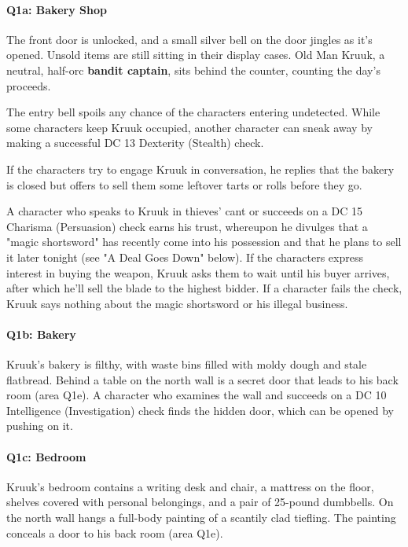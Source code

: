 \documentclass[a4paper, 11pt, bg=full, twocolumn, nooutline]{dndbook}
\begin{document}
\paragraph{Q1a: Bakery Shop}

The front door is unlocked, and a small silver bell on the door jingles as it's opened. Unsold items are still sitting in their display cases. Old Man Kruuk, a neutral, half-orc \textbf{bandit captain}, sits behind the counter, counting the day's proceeds.

The entry bell spoils any chance of the characters entering undetected. While some characters keep Kruuk occupied, another character can sneak away by making a successful DC 13 Dexterity (Stealth) check.

If the characters try to engage Kruuk in conversation, he replies that the bakery is closed but offers to sell them some leftover tarts or rolls before they go.

A character who speaks to Kruuk in thieves' cant or succeeds on a DC 15 Charisma (Persuasion) check earns his trust, whereupon he divulges that a "magic shortsword" has recently come into his possession and that he plans to sell it later tonight (see "A Deal Goes Down" below). If the characters express interest in buying the weapon, Kruuk asks them to wait until his buyer arrives, after which he'll sell the blade to the highest bidder. If a character fails the check, Kruuk says nothing about the magic shortsword or his illegal business.

\paragraph{Q1b: Bakery}

Kruuk's bakery is filthy, with waste bins filled with moldy dough and stale flatbread. Behind a table on the north wall is a secret door that leads to his back room (area Q1e). A character who examines the wall and succeeds on a DC 10 Intelligence (Investigation) check finds the hidden door, which can be opened by pushing on it.

\paragraph{Q1c: Bedroom}

Kruuk's bedroom contains a writing desk and chair, a mattress on the floor, shelves covered with personal belongings, and a pair of 25-pound dumbbells. On the north wall hangs a full-body painting of a scantily clad tiefling. The painting conceals a door to his back room (area Q1e).
\end{document}
